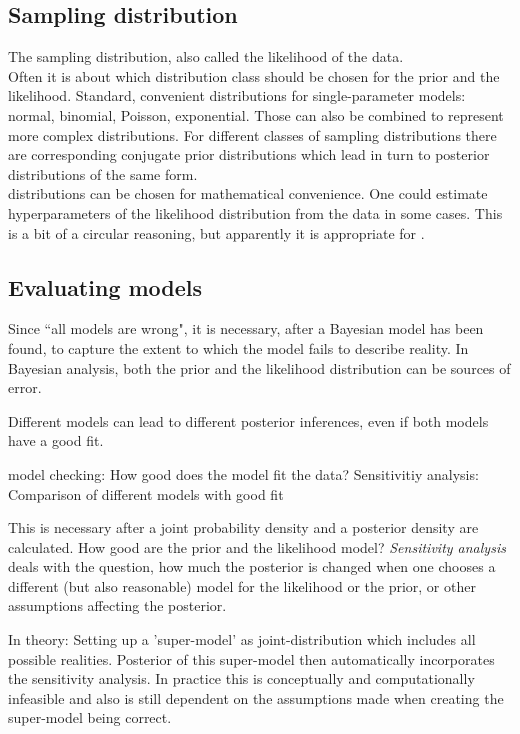 \documentclass{article}
\begin{document}
\subsection{Sampling distribution}

The sampling distribution, also called the likelihood of the data.
\\
Often it is about which distribution class should be chosen for the prior and the likelihood. Standard, convenient distributions for single-parameter models: normal, binomial, Poisson, exponential. Those can also be combined to represent more complex distributions. For different classes of sampling distributions there are corresponding conjugate prior distributions which lead in turn to posterior distributions of the same form. \cite{1439840954}
\\
distributions can be chosen for mathematical convenience. One could estimate hyperparameters of the likelihood distribution from the data in some cases. This is a bit of a circular reasoning, but apparently  it is appropriate for \cite{1439840954}.

\subsection{Evaluating models}

Since ``all models are wrong", it is necessary, after a Bayesian model has been found, to capture the extent to which the model fails to describe reality. In Bayesian analysis, both the prior and the likelihood distribution can be sources of error.

Different models can lead to different posterior inferences, even if both models have a good fit.

model checking: How good does the model fit the data?
Sensitivitiy analysis: Comparison of different models with good fit

This is necessary after a joint probability density and a posterior density are calculated. How good are the prior and the likelihood model?
\textit{Sensitivity analysis} deals with the question, how much the posterior is changed when one chooses a different (but also reasonable) model for the likelihood or the prior, or other assumptions affecting the posterior.

In theory: Setting up a 'super-model' as joint-distribution which includes all possible realities. Posterior of this super-model then automatically incorporates the sensitivity analysis. In practice this is conceptually and computationally infeasible and also is still dependent on the assumptions made when creating the super-model being correct.
\end{document}
